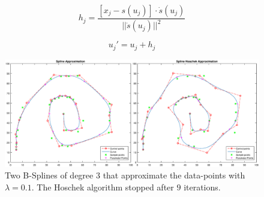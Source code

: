 \documentclass[12pt,a4paper]{article}
\begin{document}
\begin{equation}
h_j = \frac{[x_j - s(u_j)]\cdot\dot{s}(u_j)}{||\dot{s}(u_j)||^2}
\end{equation}

\begin{equation}
u_j' = u_j + h_j
\end{equation}

\begin{figure}[hbtp]
\centering
\includegraphics[width=\textwidth]{SplineApproximation.eps}
\caption{Two B-Splines of degree $3$ that approximate the data-points with $\lambda = 0.1$. The Hoschek algorithm stopped after $9$ iterations.}
\label{fig:splineApprox}
\end{figure}
\end{document}
